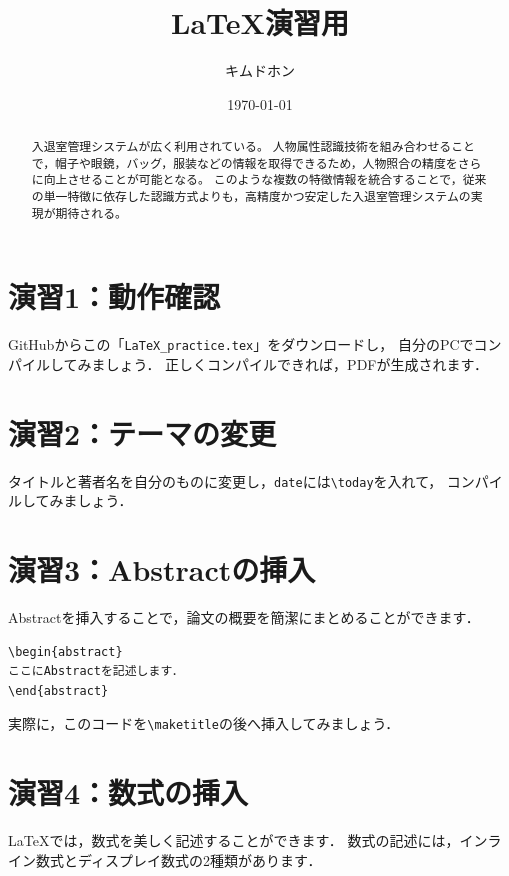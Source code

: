 \documentclass[a4paper,twocolumn,pdflatex,ja=standard]{bxjsarticle}
\title{%
LaTeX演習用
}
\author{キムドホン}
\date{\today}
\begin{document}
\maketitle

\begin{abstract}
入退室管理システムが広く利用されている。
人物属性認識技術を組み合わせることで，帽子や眼鏡，バッグ，服装などの情報を取得できるため，人物照合の精度をさらに向上させることが可能となる。
このような複数の特徴情報を統合することで，従来の単一特徴に依存した認識方式よりも，高精度かつ安定した入退室管理システムの実現が期待される。
\end{abstract}

\section*{演習1：動作確認}
GitHubからこの「\texttt{LaTeX\_practice.tex}」をダウンロードし，
自分のPCでコンパイルしてみましょう．
正しくコンパイルできれば，PDFが生成されます．

\section*{演習2：テーマの変更}
タイトルと著者名を自分のものに変更し，\texttt{date}には\verb|\today|を入れて，
コンパイルしてみましょう．

\section*{演習3：Abstractの挿入}
Abstractを挿入することで，論文の概要を簡潔にまとめることができます．

\begin{verbatim}
\begin{abstract}
ここにAbstractを記述します．
\end{abstract}
\end{verbatim}

実際に，このコードを\verb|\maketitle|の後へ挿入してみましょう．

\section*{演習4：数式の挿入}
LaTeXでは，数式を美しく記述することができます．
数式の記述には，インライン数式とディスプレイ数式の2種類があります．
\end{document}
